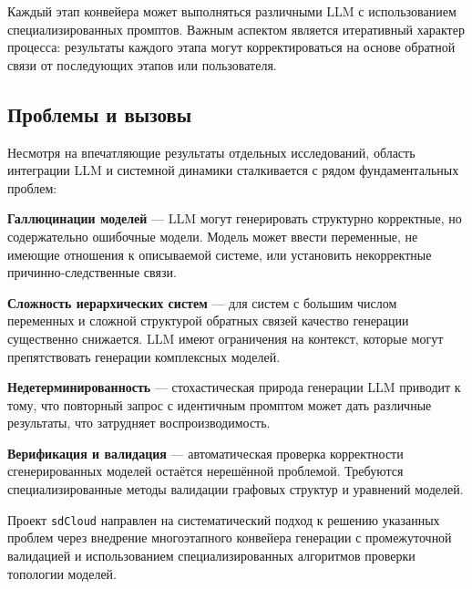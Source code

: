 Каждый этап конвейера может выполняться различными LLM с использованием специализированных промптов. Важным аспектом является итеративный характер процесса: результаты каждого этапа могут корректироваться на основе обратной связи от последующих этапов или пользователя.

\subsection{Проблемы и вызовы}

Несмотря на впечатляющие результаты отдельных исследований, область интеграции LLM и системной динамики сталкивается с рядом фундаментальных проблем:

\textbf{Галлюцинации моделей} --- LLM могут генерировать структурно корректные, но содержательно ошибочные модели. Модель может ввести переменные, не имеющие отношения к описываемой системе, или установить некорректные причинно-следственные связи.

\textbf{Сложность иерархических систем} --- для систем с большим числом переменных и сложной структурой обратных связей качество генерации существенно снижается. LLM имеют ограничения на контекст, которые могут препятствовать генерации комплексных моделей.

\textbf{Недетерминированность} --- стохастическая природа генерации LLM приводит к тому, что повторный запрос с идентичным промптом может дать различные результаты, что затрудняет воспроизводимость.

\textbf{Верификация и валидация} --- автоматическая проверка корректности сгенерированных моделей остаётся нерешённой проблемой. Требуются специализированные методы валидации графовых структур и уравнений моделей.

Проект \texttt{sdCloud} направлен на систематический подход к решению указанных проблем через внедрение многоэтапного конвейера генерации с промежуточной валидацией и использованием специализированных алгоритмов проверки топологии моделей.
